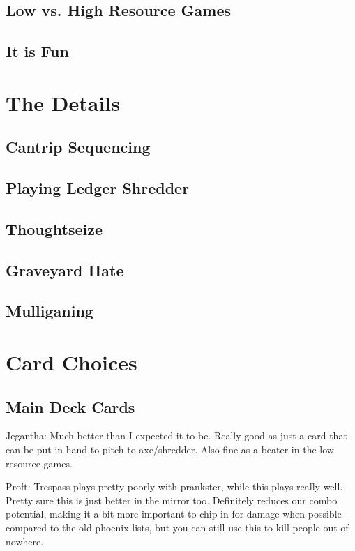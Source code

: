 \documentclass[12pt]{article}
\begin{document}
\subsection{Low vs. High Resource Games}

\subsection{It is Fun}

\clearpage
\section{The Details}
\subsection{Cantrip Sequencing}

\subsection{Playing Ledger Shredder}

\subsection{Thoughtseize}

\subsection{Graveyard Hate}

\subsection{Mulliganing}

\clearpage
\section{Card Choices}
\subsection{Main Deck Cards}
\label{sec:mainchoices}
Jegantha:
Much better than I expected it to be. Really good as just a card that can be put in hand to pitch to axe/shredder. Also fine as a beater in the low resource games.

Proft:
Trespass plays pretty poorly with prankster, while this plays really well. Pretty sure this is just better in the mirror too. Definitely reduces our combo potential, making it a bit more important to chip in for damage when possible compared to the old phoenix lists, but you can still use this to kill people out of nowhere.
\end{document}
